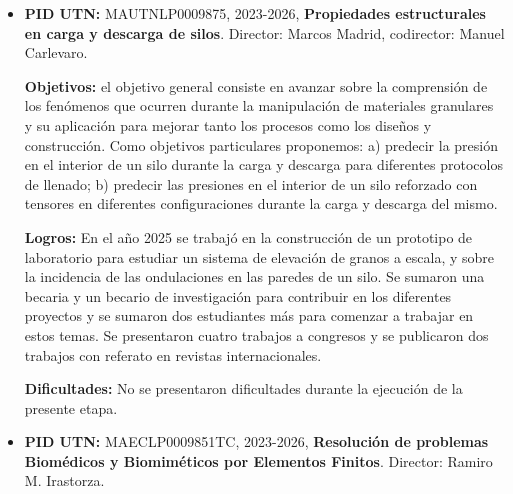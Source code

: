\documentclass[a4paper,11pt,twoside,final,titlepage,onecolumn,openright]{report}
\begin{document}
\begin{itemize}

	\item {\bf PID UTN:} MAUTNLP0009875, 2023-2026, {\bf Propiedades estructurales en carga y descarga de silos}. Director: Marcos Madrid, codirector: Manuel Carlevaro.

		      {\bf Objetivos:} el objetivo general consiste en avanzar sobre la comprensión de los fenómenos que ocurren durante la manipulación de materiales granulares y su aplicación para mejorar tanto los procesos como los diseños y construcción. Como objetivos particulares proponemos: a) predecir la presión en el interior de un silo durante la carga y descarga para diferentes protocolos de llenado; b) predecir las presiones en el interior de un silo reforzado con tensores en diferentes configuraciones durante la carga y descarga del mismo.

		      {\bf Logros:} En el año 2025 se trabajó en la construcción de un prototipo de laboratorio para estudiar un sistema de elevación de granos a escala, y sobre la incidencia de las ondulaciones en las paredes de un silo. Se sumaron una becaria y un becario de investigación para contribuir en los diferentes proyectos y se sumaron dos estudiantes más para comenzar a trabajar en estos temas. Se presentaron cuatro trabajos a congresos y se publicaron dos trabajos con referato en revistas internacionales.

		      {\bf Dificultades:} No se presentaron dificultades durante la ejecución de la presente etapa.

	\item {\bf PID UTN:} MAECLP0009851TC, 2023-2026, {\bf Resolución de problemas Biomédicos y Biomiméticos por Elementos Finitos}. Director: Ramiro M. Irastorza.


\end{itemize}
\end{document}
